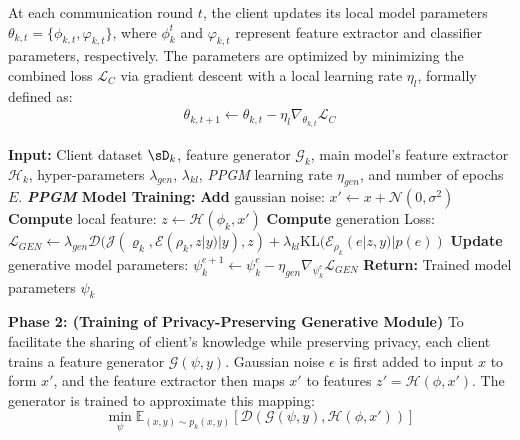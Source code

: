\documentclass[lettersize,journal]{IEEEtran}
\begin{document}
At each communication round \(t\), the client updates its local model parameters \(\theta_{k,t} = \{\phi_{k,t}, \varphi_{k,t}\}\), where \(\phi_k^t\) and \(\varphi_{k,t}\) represent feature extractor and classifier parameters, respectively. The parameters are optimized by minimizing the combined loss \(\mathcal{L}_C\) via gradient descent with a local learning rate \(\eta_l\), formally defined as:
\begin{align}
\label{eq:local_update}
    \theta_{k,t+1} \leftarrow \theta_{k,t} - \eta_l \nabla_{\theta_{k,t}} \mathcal{L}_C
\end{align}


\begin{algorithm}[t]
\caption{Training Feature Generation Module}
\label{alg:phase2}
\begin{algorithmic}[1]
\State \textbf{Input:} Client dataset $\sD_k$, feature generator $\mathcal{G}_k$, main model's feature extractor $\mathcal{H}_k$, hyper-parameters $\lambda_{gen}$, $\lambda_{kl}$, \emph{PPGM} learning rate $\eta_{gen}$, and number of epochs $E$.
\State \textbf{\emph{PPGM} Model Training:}
    \State \textbf{Add} gaussian noise: $x' \leftarrow x + \mathcal{N}(0, \sigma^2)$
    \State \textbf{Compute} local feature: $z \leftarrow \mathcal{H}(\phi_k, x')$
    \State \textbf{Compute} generation Loss: 
    $\mathcal{L}_{GEN} \leftarrow \lambda_{gen}\mathcal{D}(\mathcal{J}(\varrho_k, \mathcal{E}(\rho_k,z|y)|y), z) + \lambda_{kl}\text{KL}(\mathcal{E}_{\rho_k}(e|z,y) | p(e))$
    \State \textbf{Update} generative model parameters: $\psi_{k}^{e+1} \leftarrow \psi_{k}^{e} - \eta_{gen} \nabla_{\psi_{k}^{e}} \mathcal{L}_{GEN}$
    \EndFor
\EndFor
\State \textbf{Return:} Trained model parameters $\psi_k$
\end{algorithmic}
\end{algorithm}

\noindent\textbf{Phase 2: (Training of Privacy-Preserving Generative Module)}
To facilitate the sharing of client's knowledge while preserving privacy, each client trains a feature generator $\mathcal{G}(\psi, y)$. Gaussian noise $\epsilon$ is first added to input $x$ to form $x'$, and the feature extractor then maps $x'$ to features $z' = \mathcal{H}(\phi, x')$. 
The generator is trained to approximate this mapping:
\begin{equation}
    \min_{\psi} \mathbb{E}_{(x, y) \sim p_k(x, y)} \left[ \mathcal{D} (\mathcal{G}(\psi, y), \mathcal{H}(\phi, x')) \right]
\end{equation}
\end{document}
